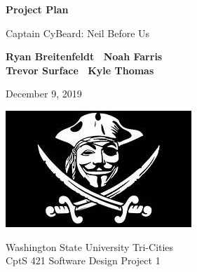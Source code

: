 \begin{titlepage}
    \begin{center}
        \vspace*{1cm}

        \Huge
        \textbf{Project Plan}

        \vspace{.5cm}
        \LARGE
        Captain CyBeard: Neil Before Us

        \vspace{1cm}

        \textbf{Ryan Breitenfeldt \textbar\ Noah Farris\\ Trevor Surface \textbar\ Kyle Thomas}

        \vspace{.2cm}
        \Large
        December 9, 2019

        \vspace{2cm}
        \includegraphics[scale=1]{logo}

        \vfill

        Washington State University Tri-Cities\\
        CptS 421 Software Design Project 1

    \end{center}
\end{titlepage}


